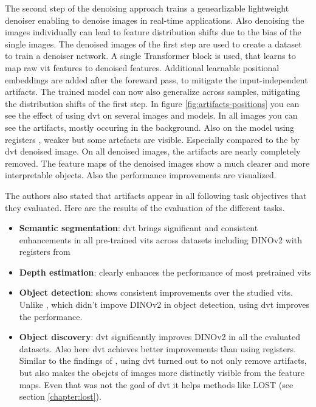 \documentclass[conference]{IEEEtran}
\begin{document}
  The second step of the denoising approach trains a genearlizable lightweight denoiser enabling to denoise images in real-time applications. Also denoising the images individually can lead to feature distribution shifts due to the bias of the single images. The denoised images of the first step are used to create a dataset to train a denoiser network. A single Transformer block is used, that learns to map raw \ac{vit} features to denoised features. Additional learnable positional embeddings are added after the foreward pass, to mitigate the input-independent artifacts. The trained model can now also generalize across samples, mitigating the distribution shifts of the first step. In figure \ref{fig:artifacts-positions} you can see the effect of using \ac{dvt} on several images and models. In all images you can see the artifacts, mostly occuring in the background. Also on the model using registers \cite{registers}, weaker but some artefacts are visible. Especially compared to the by \ac{dvt} denoised image. On all denoised images, the artifacts are nearly completely removed. The feature maps of the denoised images show a much clearer and more interpretable objects. Also the performance improvements are visualized. \cite{denoising}

  The authors also stated that artifacts appear in all following task objectives that they evaluated. Here are the results of the evaluation of the different tasks.
  \begin{itemize}
    \item \textbf{Semantic segmentation}: \ac{dvt} brings significant and consistent
    enhancements in all pre-trained \acp{vit} across datasets including \mbox{DINOv2} with registers from \cite{registers}
    \item \textbf{Depth estimation}: clearly enhances the performance of most pretrained \acp{vit}
    \item \textbf{Object detection}: shows consistent improvements over the studied \acp{vit}. Unlike \cite{registers}, which didn't impove \mbox{DINOv2} in object detection, using \ac{dvt} improves the performance.
    \item \textbf{Object discovery}:  \ac{dvt} significantly improves
    \mbox{DINOv2} in all the evaluated datasets. Also here \ac{dvt} achieves better improvements than \cite{registers} using registers. Similar to the findings of \cite{registers}, using \ac{dvt} turned out to not only remove artifacts, but also makes the obejcts of images more distinctly visible from the feature maps. Even that was not the goal of \ac{dvt} it helps methods like \mbox{LOST} (see section \ref{chapter:lost}). \cite{denoising}
  \end{itemize}
\end{document}
